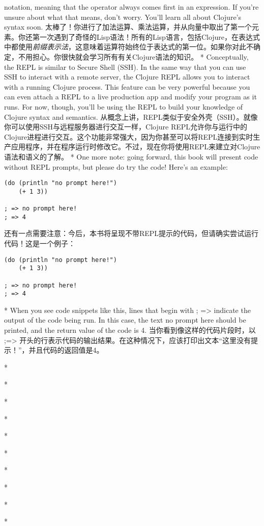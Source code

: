 \begin{paracol}{2}
{notation}, meaning that the operator always comes first in an
expression. If you're unsure about what that means, don't worry. You'll
learn all about Clojure's syntax soon.
\switchcolumn
太棒了！你进行了加法运算、乘法运算，并从向量中取出了第一个元素。你还第一次遇到了奇怪的Lisp语法！所有的Lisp语言，包括Clojure，在表达式中都使用\emph{前缀表示法}，这意味着运算符始终位于表达式的第一位。如果你对此不确定，不用担心。你很快就会学习所有有关Clojure语法的知识。
\switchcolumn[0]*
Conceptually, the REPL is similar to Secure Shell (SSH). In the same way
that you can use SSH to interact with a remote server, the Clojure REPL
allows you to interact with a running Clojure process. This feature can
be very powerful because you can even attach a REPL to a live production
app and modify your program as it runs. For now, though, you'll be using
the REPL to build your knowledge of Clojure syntax and semantics.
\switchcolumn
从概念上讲，REPL类似于安全外壳（SSH）。就像你可以使用SSH与远程服务器进行交互一样，Clojure REPL允许你与运行中的Clojure进程进行交互。这个功能非常强大，因为你甚至可以将REPL连接到实时生产应用程序，并在程序运行时修改它。不过，现在你将使用REPL来建立对Clojure语法和语义的了解。
\switchcolumn[0]*
One more note: going forward, this book will present code without REPL
prompts, but please do try the code! Here's an example:
\begin{verbatim}
(do (println "no prompt here!")
    (+ 1 3))

; => no prompt here!
; => 4
\end{verbatim}
\switchcolumn
还有一点需要注意：今后，本书将呈现不带REPL提示的代码，但请确实尝试运行代码！这是一个例子：
\begin{verbatim}
(do (println "no prompt here!")
    (+ 1 3))

; => no prompt here!
; => 4
\end{verbatim}
\switchcolumn[0]*
When you see code snippets like this, lines that begin with ;
=\textgreater{} indicate the output of the code being run. In this case,
the text no prompt here should be printed, and the return value of the
code is 4.
\switchcolumn
当你看到像这样的代码片段时，以 ;=\textgreater{} 开头的行表示代码的输出结果。在这种情况下，应该打印出文本“这里没有提示！”，并且代码的返回值是4。

\switchcolumn[0]*

\switchcolumn\switchcolumn[0]*

\switchcolumn

\switchcolumn[0]*

\switchcolumn


\switchcolumn[0]*

\switchcolumn\switchcolumn[0]*

\switchcolumn

\switchcolumn[0]*

\switchcolumn


\switchcolumn[0]*

\switchcolumn\switchcolumn[0]*

\switchcolumn

\switchcolumn[0]*

\switchcolumn


\switchcolumn[0]*

\switchcolumn
\end{paracol}
